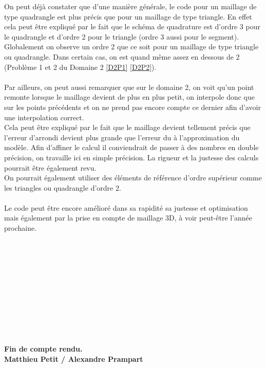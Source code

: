 \documentclass[a4paper, 12pt, french]{report}
\begin{document}
On peut déjà constater que d'une manière générale, le code pour un maillage de type quadrangle est plus précis que pour un maillage de type triangle. En effet cela peut être expliqué par le fait que le schéma de quadrature est d'ordre 3 pour le quadrangle et d'ordre 2 pour le triangle (ordre 3 aussi pour le segment).\\
Globalement on observe un ordre 2 que ce soit pour un maillage de type triangle ou quadrangle. Dans certain cas, on est quand même assez en dessous de 2 (Problème 1 et 2 du Domaine 2 \ref{D2P1} \ref{D2P2}).\\\\
Par ailleurs, on peut aussi remarquer que sur le domaine 2, on voit qu'un point remonte lorsque le maillage devient de plus en plus petit, on interpole donc que sur les points précédents et on ne prend pas encore compte ce dernier afin d'avoir une interpolation correct.\\
Cela peut être expliqué par le fait que le maillage devient tellement précis que l'erreur d'arrondi devient plus grande que l'erreur du à l'approximation du modèle. Afin d'affiner le calcul il conviendrait de passer à des nombres en double précision, on travaille ici en simple précision. La rigueur et la justesse des calculs pourrait être également revu.\\
On pourrait également utiliser des éléments de référence d'ordre supérieur comme les triangles ou quadrangle d'ordre 2.\\\\
Le code peut être encore amélioré dans sa rapidité sa justesse et optimisation mais également par la prise en compte de maillage 3D, à voir peut-être l'année prochaine.\\\\\\\\\\\\\\\\\\\\\\\\
\textbf{Fin de compte rendu.\\Matthieu Petit / Alexandre Prampart}
\end{document}
